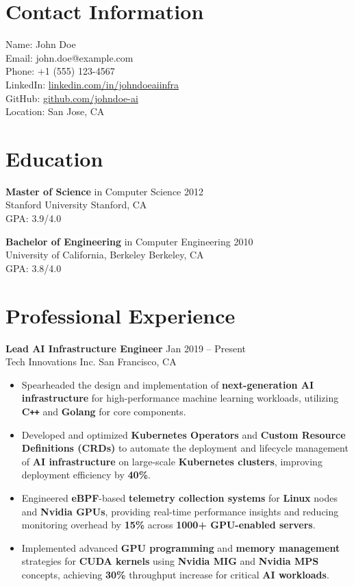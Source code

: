 \documentclass[11pt,a4paper]{article}
\begin{document}
\section*{Contact Information}
Name: John Doe \\
Email: john.doe@example.com \\
Phone: +1 (555) 123-4567 \\
LinkedIn: \href{https://www.linkedin.com/in/johndoeaiinfra}{linkedin.com/in/johndoeaiinfra} \\
GitHub: \href{https://github.com/johndoe-ai}{github.com/johndoe-ai} \\
Location: San Jose, CA

\section*{Education}
\textbf{Master of Science} in Computer Science \hfill 2012 \\
Stanford University \hfill Stanford, CA \\
GPA: 3.9/4.0

\textbf{Bachelor of Engineering} in Computer Engineering \hfill 2010 \\
University of California, Berkeley \hfill Berkeley, CA \\
GPA: 3.8/4.0

\section*{Professional Experience}
\textbf{Lead AI Infrastructure Engineer} \hfill Jan 2019 – Present \\
Tech Innovations Inc. \hfill San Francisco, CA
\begin{itemize}
    \item Spearheaded the design and implementation of \textbf{next-generation AI infrastructure} for high-performance machine learning workloads, utilizing \textbf{C\texttt{++}} and \textbf{Golang} for core components.
    \item Developed and optimized \textbf{Kubernetes Operators} and \textbf{Custom Resource Definitions (CRDs)} to automate the deployment and lifecycle management of \textbf{AI infrastructure} on large-scale \textbf{Kubernetes clusters}, improving deployment efficiency by \textbf{40\%}.
    \item Engineered \textbf{eBPF}-based \textbf{telemetry collection systems} for \textbf{Linux} nodes and \textbf{Nvidia GPUs}, providing real-time performance insights and reducing monitoring overhead by \textbf{15\%} across \textbf{1000+ GPU-enabled servers}.
    \item Implemented advanced \textbf{GPU programming} and \textbf{memory management} strategies for \textbf{CUDA kernels} using \textbf{Nvidia MIG} and \textbf{Nvidia MPS} concepts, achieving \textbf{30\%} throughput increase for critical \textbf{AI workloads}.
\end{itemize}
\end{document}
